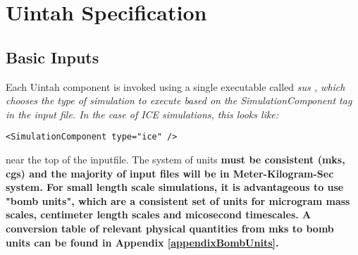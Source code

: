 \section{Uintah Specification}
\subsection{Basic Inputs}
Each Uintah component is invoked using a single executable called \it sus \normalfont, which chooses the type of simulation to execute based on the \it SimulationComponent \normalfont tag in the input file.  In the case of ICE simulations, this looks like:
%
\begin{Verbatim}[fontsize=\footnotesize]
 <SimulationComponent type="ice" />
\end{Verbatim}
%
near the top of the inputfile.  The system of units \bf{must }\normalfont be consistent (mks, cgs) and the majority of input files will be in Meter-Kilogram-Sec system.  For small length scale simulations, it is advantageous to use "bomb units", which are a consistent set of units for microgram mass scales, centimeter length scales and micosecond timescales.  A conversion table of relevant physical quantities from mks to bomb units can be found in Appendix \ref{appendixBombUnits}.


%

